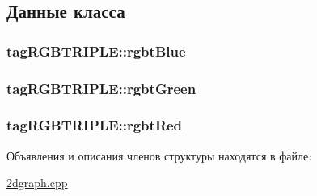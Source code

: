 \subsection{Данные класса}
\hypertarget{structtag_r_g_b_t_r_i_p_l_e_adbebf9e7802cdfffbdae31c08a71dab7}{
\subsubsection[{rgbt\+Blue}]{ tag\+R\+G\+B\+T\+R\+I\+P\+L\+E\+::rgbt\+Blue}}\label{structtag_r_g_b_t_r_i_p_l_e_adbebf9e7802cdfffbdae31c08a71dab7}
\hypertarget{structtag_r_g_b_t_r_i_p_l_e_a2e3e106422819352693de65189cc341f}{
\subsubsection[{rgbt\+Green}]{ tag\+R\+G\+B\+T\+R\+I\+P\+L\+E\+::rgbt\+Green}}\label{structtag_r_g_b_t_r_i_p_l_e_a2e3e106422819352693de65189cc341f}
\hypertarget{structtag_r_g_b_t_r_i_p_l_e_ae61b0771fd3e1e267a3495dcfba5e21c}{
\subsubsection[{rgbt\+Red}]{ tag\+R\+G\+B\+T\+R\+I\+P\+L\+E\+::rgbt\+Red}}\label{structtag_r_g_b_t_r_i_p_l_e_ae61b0771fd3e1e267a3495dcfba5e21c}


Объявления и описания членов структуры находятся в файле\+:\begin{DoxyCompactItemize}
\item 
\hyperlink{2dgraph_8cpp}{2dgraph.\+cpp}\end{DoxyCompactItemize}
